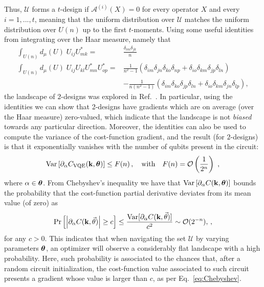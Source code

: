 Thus, $\mathcal{U}$ forms a $t$-design if $\mathcal{A}^{(i)}(X) = 0$ for every operator $X$ and every $i=1,...,t$, meaning that the uniform distribution over $\mathcal{U}$ matches the uniform distribution over $U(n)$ up to the first $t$-moments. Using some useful identities from integrating over the Haar measure, namely that
\begin{align}\label{eq:relations_haar}
\int_{U(n)} d_\mu(U) \; U_{ij} U^{*}_{mk} =& \frac{\delta_{im}\delta_{jk}}{n} \\
\int_{U(n)} d_\mu(U) \; U_{ij} U_{kl} U^*_{mn} U^*_{op}  =& \frac{1}{n^2-1}(\delta_{im} \delta_{jn} \delta_{ko} \delta_{np} + \delta_{io} \delta_{km} \delta_{jp} \delta_{ln}) \\ & -\frac{1}{n(n^2-1)}(\delta_{i m} \delta_{ko} \delta_{jp} \delta_{ln} + \delta_{io} \delta_{km} \delta_{jn} \delta_{lp}), \nonumber
\end{align}
the landscape of $2$-designs was explored in Ref.~\cite{mcclean2018barren}. In particular, using the identities we can show that 2-designs have gradients which are on average (over the Haar measure) zero-valued, which indicate that the landscape is not \textit{biased} towards any particular direction. Moreover, the identities can also be used to compute the variance of the cost-function gradient, and the result (for $2$-designs) is that it exponentially vanishes with the number of qubits present in the circuit:
\begin{equation}\label{eq:BP}
    \Var\left[\partial _\alpha C_{\text{VQE}}(\kvec,\thv)\right]\leq F(n)\,, \quad \text{with} \quad F(n)= \OC\left(\frac{1}{2^n}\right)\ ,
\end{equation}
where $\alpha\in\bm{\theta}$. From Chebyshev's inequality we have that ${\rm Var}\left[\partial _{\alpha} C(\mathbf{k},\bm{\theta})\right]$ bounds the probability that the cost-function partial derivative deviates from its mean value (of zero) as
\begin{equation}\label{eq:Chebyshev}
    \Pr\left[\left|\partial_\alpha C(\mathbf{k},\vec{\theta})\right|\geq c\right]\leq\frac{{\rm Var}[\partial_\alpha C(\mathbf{k},\vec{\theta})]}{c^2} \sim \mathcal{O}(2^{-n}),\,,
\end{equation}
for any $c>0$. This indicates that when navigating the set $\mathcal{U}$ by varying parameters $\bm{\theta}$, an optimizer will observe a considerably flat landscape with a high probability. Here, such probability is associated to the chances that, after a random circuit initialization, the cost-function value associated to such circuit presents a gradient whose value is larger than $c$, as per Eq.~\ref{eq:Chebyshev}.

